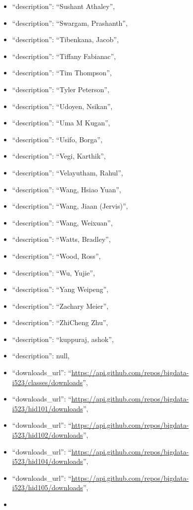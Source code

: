 \begin{itemize}
\item
  ``description'': ``Sushant Athaley'',
\item
  ``description'': ``Swargam, Prashanth'',
\item
  ``description'': ``Tibenkana, Jacob'',
\item
  ``description'': ``Tiffany Fabianac'',
\item
  ``description'': ``Tim Thompson'',
\item
  ``description'': ``Tyler Peterson'',
\item
  ``description'': ``Udoyen, Nsikan'',
\item
  ``description'': ``Uma M Kugan'',
\item
  ``description'': ``Usifo, Borga'',
\item
  ``description'': ``Vegi, Karthik'',
\item
  ``description'': ``Velayutham, Rahul'',
\item
  ``description'': ``Wang, Hsiao Yuan'',
\item
  ``description'': ``Wang, Jiaan (Jervis)'',
\item
  ``description'': ``Wang, Weixuan'',
\item
  ``description'': ``Watts, Bradley'',
\item
  ``description'': ``Wood, Ross'',
\item
  ``description'': ``Wu, Yujie'',
\item
  ``description'': ``Yang Weipeng'',
\item
  ``description'': ``Zachary Meier'',
\item
  ``description'': ``ZhiCheng Zhu'',
\item
  ``description'': ``kuppuraj, ashok'',
\item
  ``description'': null,
\item
  ``downloads\_url'':
  ``\url{https://api.github.com/repos/bigdata-i523/classes/downloads}'',
\item
  ``downloads\_url'':
  ``\url{https://api.github.com/repos/bigdata-i523/hid101/downloads}'',
\item
  ``downloads\_url'':
  ``\url{https://api.github.com/repos/bigdata-i523/hid102/downloads}'',
\item
  ``downloads\_url'':
  ``\url{https://api.github.com/repos/bigdata-i523/hid104/downloads}'',
\item
  ``downloads\_url'':
  ``\url{https://api.github.com/repos/bigdata-i523/hid105/downloads}'',
\item

\end{itemize}
